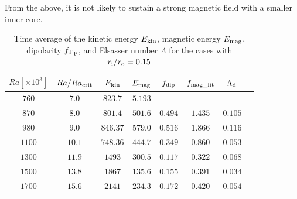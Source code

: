 From the above, it is not likely to sustain a strong magnetic field with a smaller inner core.
%
\begin{table}
 \begin{center}
\caption{Time average of the kinetic energy $E_{\rm kin}$, magnetic energy $E_{\rm mag}$, dipolarity $f_{\rm dip}$, and Elsasser number $\Lambda$ for the cases with $r_{\rm i}/r_{\rm o} = 0.15$}
  \begin{tabular}{cccccccc}
      \hline
     $Ra[\times 10^3]$  &  $Ra/Ra_{\rm crit}$&  $E_{\rm kin}$  &  $E_{\rm mag}$ & $f_{\rm dip}$ & $f_{\rm mag\_fit}$ & $\Lambda_{\rm d}$\\
    \hline \hline
    $760$  & $7.0$ &  $823.7$ & $5.193$ & $-$ & $-$ & $-$\\
    $870$  & $8.0$ &  $801.4$ & $501.6$ & $0.494$ & $1.435$ & $0.105$\\
    $980$  & $9.0$ &  $846.37$ & $579.0$ & $0.516$ & $1.866$ &$0.116$\\
    $1100$  & $10.1$ &  $748.36$ & $444.7$ & $0.349$ & $0.860$ & $0.053$\\
    $1300$  & $11.9$ &  $1493$ & $300.5$ & $0.117$ & $0.322$ & $0.068$\\
    $1500$  & $13.8$ &  $1867$ & $135.6$ & $0.155$ & $0.391$ & $0.034$\\
    $1700$  & $15.6$ &  $2141$ & $234.3$ & $0.172$ & $0.420$ & $0.054$\\
     \hline
  \end{tabular}
 \end{center}
 \label{table:Summary_15}
 \end{table}
 
